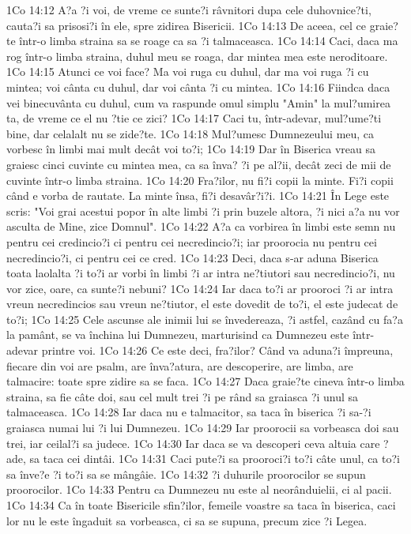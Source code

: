 1Co 14:12  A?a ?i voi, de vreme ce sunte?i râvnitori dupa cele duhovnice?ti, cauta?i sa prisosi?i în ele, spre zidirea Bisericii.
1Co 14:13  De aceea, cel ce graie?te într-o limba straina sa se roage ca sa ?i talmaceasca.
1Co 14:14  Caci, daca ma rog într-o limba straina, duhul meu se roaga, dar mintea mea este neroditoare.
1Co 14:15  Atunci ce voi face? Ma voi ruga cu duhul, dar ma voi ruga ?i cu mintea; voi cânta cu duhul, dar voi cânta ?i cu mintea.
1Co 14:16  Fiindca daca vei binecuvânta cu duhul, cum va raspunde omul simplu "Amin" la mul?umirea ta, de vreme ce el nu ?tie ce zici?
1Co 14:17  Caci tu, într-adevar, mul?ume?ti bine, dar celalalt nu se zide?te.
1Co 14:18  Mul?umesc Dumnezeului meu, ca vorbesc în limbi mai mult decât voi to?i;
1Co 14:19  Dar în Biserica vreau sa graiesc cinci cuvinte cu mintea mea, ca sa înva? ?i pe al?ii, decât zeci de mii de cuvinte într-o limba straina.
1Co 14:20  Fra?ilor, nu fi?i copii la minte. Fi?i copii când e vorba de rautate. La minte însa, fi?i desavâr?i?i.
1Co 14:21  În Lege este scris: "Voi grai acestui popor în alte limbi ?i prin buzele altora, ?i nici a?a nu vor asculta de Mine, zice Domnul".
1Co 14:22  A?a ca vorbirea în limbi este semn nu pentru cei credincio?i ci pentru cei necredincio?i; iar proorocia nu pentru cei necredincio?i, ci pentru cei ce cred.
1Co 14:23  Deci, daca s-ar aduna Biserica toata laolalta ?i to?i ar vorbi în limbi ?i ar intra ne?tiutori sau necredincio?i, nu vor zice, oare, ca sunte?i nebuni?
1Co 14:24  Iar daca to?i ar prooroci ?i ar intra vreun necredincios sau vreun ne?tiutor, el este dovedit de to?i, el este judecat de to?i;
1Co 14:25  Cele ascunse ale inimii lui se învedereaza, ?i astfel, cazând cu fa?a la pamânt, se va închina lui Dumnezeu, marturisind ca Dumnezeu este într-adevar printre voi.
1Co 14:26  Ce este deci, fra?ilor? Când va aduna?i împreuna, fiecare din voi are psalm, are înva?atura, are descoperire, are limba, are talmacire: toate spre zidire sa se faca.
1Co 14:27  Daca graie?te cineva într-o limba straina, sa fie câte doi, sau cel mult trei ?i pe rând sa graiasca ?i unul sa talmaceasca.
1Co 14:28  Iar daca nu e talmacitor, sa taca în biserica ?i sa-?i graiasca numai lui ?i lui Dumnezeu.
1Co 14:29  Iar proorocii sa vorbeasca doi sau trei, iar ceilal?i sa judece.
1Co 14:30  Iar daca se va descoperi ceva altuia care ?ade, sa taca cei dintâi.
1Co 14:31  Caci pute?i sa prooroci?i to?i câte unul, ca to?i sa înve?e ?i to?i sa se mângâie.
1Co 14:32  ?i duhurile proorocilor se supun proorocilor.
1Co 14:33  Pentru ca Dumnezeu nu este al neorânduielii, ci al pacii.
1Co 14:34  Ca în toate Bisericile sfin?ilor, femeile voastre sa taca în biserica, caci lor nu le este îngaduit sa vorbeasca, ci sa se supuna, precum zice ?i Legea.
